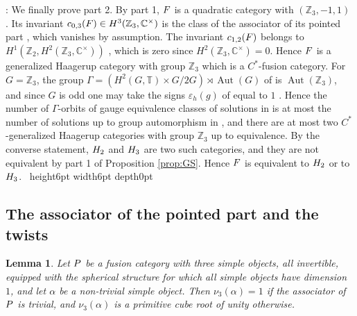 \documentclass[leqno]{article}
\newcommand{\Cbb}{\ensuremath{\mathbb{C}}}
\let\cal\relax
\newcommand{\cal}{\mathcal}
\newcommand{\Z}{\ensuremath{\mathbb{Z}}}
\newcommand{\T}{\ensuremath{\mathbb{T}}}
\newcommand{\qed}{\hfill \vrule height6pt  width6pt depth0pt}
\newcommand{\epsi}{\varepsilon}
\newtheorem{lemma}[thm]{Lemma}
\newenvironment{proof}[1][]{\noindent {\it Proof #1} : }{\hbox{~}\qed
\smallskip
}
\numberwithin{equation}{section}
\begin{document}
\begin{proof}
We finally prove part 2. By part 1, $\cal F$ is a quadratic category with $(\Z_3,-1,1)$ \cite[Definition 2.1 p.~6]{Izu18}. Its invariant $c_{0,3}(\cal F) \in H^3(\Z_3,\Cbb^\times)$ is the class of the associator of its pointed part \cite[p.~9]{Izu18}, which vanishes by assumption. The invariant $c_{1,2}(\cal F)$ belongs to $H^1(\Z_2,H^2(\Z_3,\Cbb^\times))$ \cite[pp.~10--11]{Izu18}, which is zero since $H^2(\Z_3,\Cbb^\times) = 0$. Hence $\cal F$ is a generalized Haagerup category with group $\Z_3$ \cite[Definition 2.7 p.~12]{Izu18} which is a $C^*$-fusion category. For $G = \Z_3$, the group $\Gamma = (H^2(G,\T) \times G/2G) \rtimes \operatorname{Aut}(G)$ of \cite[Theorem 5.9 p.~36]{Izu18} is $\operatorname{Aut}(\Z_3)$, and since $G$ is odd one may take the signs $\epsi_h(g)$ of \cite{Izu18} equal to $1$ \cite[p.~56]{Izu18}. Hence the number of $\Gamma$-orbits of gauge equivalence classes of solutions in \cite[Theorem 5.9 p.~36]{Izu18} is at most the number of solutions up to group automorphism in \cite[Theorem 9.1 p.~57]{Izu18}, and there are at most two $C^*$-generalized Haagerup categories with group $\Z_3$ up to equivalence. By the converse statement, $\cal H_2$ and $\cal H_3$ are two such categories, and they are not equivalent by part 1 of Proposition \ref{prop:GS}. Hence $\cal F$ is equivalent to $\cal H_2$ or to $\cal H_3$.
\end{proof}

\subsection{The associator of the pointed part and the twists}
\label{subsec:twisted}

\begin{lemma}
\label{lem:nu3}
Let $\cal P$ be a fusion category with three simple objects, all invertible, equipped with the spherical structure for which all simple objects have dimension $1$, and let $\alpha$ be a non-trivial simple object. Then $\nu_3(\alpha) = 1$ if the associator of $\cal P$ is trivial, and $\nu_3(\alpha)$ is a primitive cube root of unity otherwise.
\end{lemma}
\end{document}
